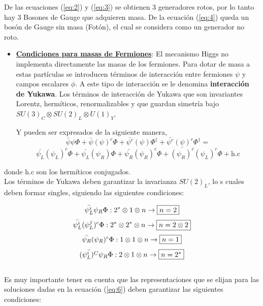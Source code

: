 \documentclass[12pt]{article}
\begin{document}
\begin{enumerate}
De las ecuaciones (\ref{eq:2}) y (\ref{eq:3}) se obtienen 3 generadores rotos, por lo tanto hay 3 Bosones de Gauge que adquieren masa. De la ecuación (\ref{eq:4}) queda un bosón de Gauge sin masa (Fotón), el cual se considera como un generador no roto. \\ 


\begin{itemize}
\item \underline{ \textbf{Condiciones para masas de Fermiones}}: El mecanismo Higgs no implementa directamente las masas de los fermiones. Para dotar de masa a estas partículas se introducen términos de interacción entre fermiones \(\psi\) y campos escalares \(\phi\). A este tipo de
interacción se le denomina \textbf{interacción de Yukawa}. Los términos de
interacción de Yukawa que son invariantes Lorentz, hermíticos, renormalizables y que guardan simetría bajo \(SU(3)_C \otimes SU(2)_L \otimes U(1)_Y \).

Y pueden ser expresados de la siguiente manera, \\

\[\bar{\psi}\psi\Phi + \bar{\psi}(\psi)^{c}\Phi +  \bar{\psi^c}(\psi)\Phi^{\dagger} + \bar{\psi^c}(\psi)^c\Phi^{\dagger} = \]
\begin{equation}
    \bar{\psi_L}(\psi_L)^{c}\Phi + \bar{\psi_L}(\psi_R)\Phi  +  \bar{\psi_R}(\psi_R)^c\Phi + \bar{(\psi_R)^c}(\psi_L)^c\Phi + \text{h.c}  
    \label{eq:5}
\end{equation}
\end{itemize}

donde h.c son los hermíticos conjugados. \\

Los términos de Yukawa deben garantizar la invarianza \(SU(2)_L\), lo s cuales deben formar singles, siguiendo las siguientes condiciones:

\[\bar{\psi_L^i}\psi_R\Phi : 2^*\otimes1 \otimes n \rightarrow \fbox{$n=2$}
 \]
\begin{equation}
\label{eq:21}
    \bar{{\psi}_L^i}({\psi}_L^j)^c\Phi : 2^* \otimes 2^*\otimes n \rightarrow \fbox{$n=2\otimes 2$} \end{equation}
\[\bar{\psi_R}(\psi_R)^c\Phi : 1\otimes 1\otimes n \rightarrow \fbox{$n=1 $}\]
\begin{equation}
\bar{(\psi_L^i)^C}\psi_R\Phi : 2\otimes1 \otimes n \rightarrow \fbox{$n= 2^*$}
\label{eq:6}
\end{equation} \\

Es muy importante tener en cuenta que las representaciones que se elijan para las soluciones dadas en la ecuación (\ref{eq:6}) deben garantizar las siguientes condiciones:


\end{enumerate}
\end{document}
